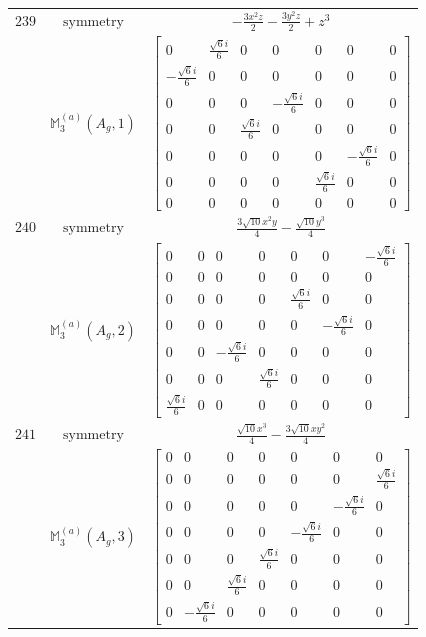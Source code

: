 \documentclass[fleqn,8pt,landscape]{jsarticle}
\begin{document}
\begin{longtable}{ccc}
$ 239 $ & $ \text{symmetry} $ & $ - \frac{3 x^{2} z}{2} - \frac{3 y^{2} z}{2} + z^{3} $ \\
$  $ & $ \mathbb{M}_{3}^{(a)}(A_{g},1) $ & $ \begin{bmatrix} 0 & \frac{\sqrt{6} i}{6} & 0 & 0 & 0 & 0 & 0 \\ - \frac{\sqrt{6} i}{6} & 0 & 0 & 0 & 0 & 0 & 0 \\ 0 & 0 & 0 & - \frac{\sqrt{6} i}{6} & 0 & 0 & 0 \\ 0 & 0 & \frac{\sqrt{6} i}{6} & 0 & 0 & 0 & 0 \\ 0 & 0 & 0 & 0 & 0 & - \frac{\sqrt{6} i}{6} & 0 \\ 0 & 0 & 0 & 0 & \frac{\sqrt{6} i}{6} & 0 & 0 \\ 0 & 0 & 0 & 0 & 0 & 0 & 0 \end{bmatrix} $ \\ \hline
$ 240 $ & $ \text{symmetry} $ & $ \frac{3 \sqrt{10} x^{2} y}{4} - \frac{\sqrt{10} y^{3}}{4} $ \\
$  $ & $ \mathbb{M}_{3}^{(a)}(A_{g},2) $ & $ \begin{bmatrix} 0 & 0 & 0 & 0 & 0 & 0 & - \frac{\sqrt{6} i}{6} \\ 0 & 0 & 0 & 0 & 0 & 0 & 0 \\ 0 & 0 & 0 & 0 & \frac{\sqrt{6} i}{6} & 0 & 0 \\ 0 & 0 & 0 & 0 & 0 & - \frac{\sqrt{6} i}{6} & 0 \\ 0 & 0 & - \frac{\sqrt{6} i}{6} & 0 & 0 & 0 & 0 \\ 0 & 0 & 0 & \frac{\sqrt{6} i}{6} & 0 & 0 & 0 \\ \frac{\sqrt{6} i}{6} & 0 & 0 & 0 & 0 & 0 & 0 \end{bmatrix} $ \\ \hline
$ 241 $ & $ \text{symmetry} $ & $ \frac{\sqrt{10} x^{3}}{4} - \frac{3 \sqrt{10} x y^{2}}{4} $ \\
$  $ & $ \mathbb{M}_{3}^{(a)}(A_{g},3) $ & $ \begin{bmatrix} 0 & 0 & 0 & 0 & 0 & 0 & 0 \\ 0 & 0 & 0 & 0 & 0 & 0 & \frac{\sqrt{6} i}{6} \\ 0 & 0 & 0 & 0 & 0 & - \frac{\sqrt{6} i}{6} & 0 \\ 0 & 0 & 0 & 0 & - \frac{\sqrt{6} i}{6} & 0 & 0 \\ 0 & 0 & 0 & \frac{\sqrt{6} i}{6} & 0 & 0 & 0 \\ 0 & 0 & \frac{\sqrt{6} i}{6} & 0 & 0 & 0 & 0 \\ 0 & - \frac{\sqrt{6} i}{6} & 0 & 0 & 0 & 0 & 0 \end{bmatrix} $ \\ \hline

\end{longtable}
\end{document}
